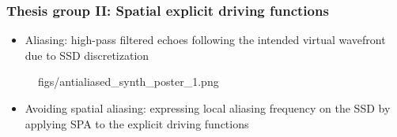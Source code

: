 \documentclass{beamer}
\begin{document}
\begin{frame}
\frametitle{Thesis group II: Spatial explicit driving functions}
\begin{itemize}
\item Aliasing: high-pass filtered echoes following the intended virtual wavefront due to SSD discretization
\end{itemize}
	\vspace{-3.5mm}	
	\begin{figure}
	\centering
	\begin{overpic}[width = 0.65\columnwidth ]{figs/antialiased_synth_poster_1.png}
	\end{overpic}
	\end{figure} 
	\vspace{-7mm}
		\begin{itemize}
		\item Avoiding spatial aliasing: expressing local aliasing frequency on the SSD by applying SPA to the explicit driving functions
		\end{itemize}
\end{frame}
\end{document}
